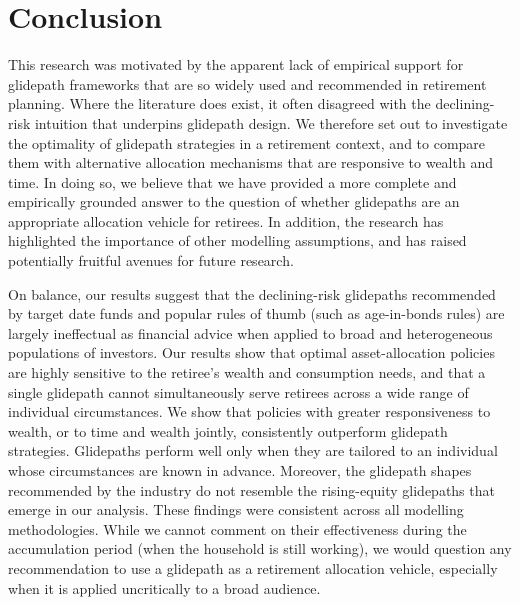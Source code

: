 \documentclass[11pt]{article}
\begin{document}
\section{Conclusion}

This research was motivated by the apparent lack of empirical support for glidepath frameworks that are so widely used and recommended in retirement planning. Where the literature does exist, it often disagreed with the declining-risk intuition that underpins glidepath design. We therefore set out to investigate the optimality of glidepath strategies in a retirement context, and to compare them with alternative allocation mechanisms that are responsive to wealth and time. In doing so, we believe that we have provided a more complete and empirically grounded answer to the question of whether glidepaths are an appropriate allocation vehicle for retirees. In addition, the research has highlighted the importance of other modelling assumptions, and has raised potentially fruitful avenues for future research.

On balance, our results suggest that the declining-risk glidepaths recommended by target date funds and popular rules of thumb (such as age-in-bonds rules) are largely ineffectual as financial advice when applied to broad and heterogeneous populations of investors. Our results show that optimal asset-allocation policies are highly sensitive to the retiree's wealth and consumption needs, and that a single glidepath cannot simultaneously serve retirees across a wide range of individual circumstances. We show that policies with greater responsiveness to wealth, or to time and wealth jointly, consistently outperform glidepath strategies. Glidepaths perform well only when they are tailored to an individual whose circumstances are known in advance. Moreover, the glidepath shapes recommended by the industry do not resemble the rising-equity glidepaths that emerge in our analysis. These findings were consistent across all modelling methodologies. While we cannot comment on their effectiveness during the accumulation period (when the household is still working), we would question any recommendation to use a glidepath as a retirement allocation vehicle, especially when it is applied uncritically to a broad audience.
\end{document}
